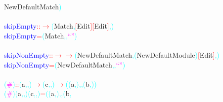 {\rm{}NewDefaultMatch}\textcolor{cyan}{)}\\\\\textcolor{blue}{skipEmpty}\hsspace \textcolor{red}{::}\hsspace \textcolor{red}{\ensuremath{\rightarrow}}\hsspace \textcolor{cyan}{(}{\rm{}Match}\textcolor{cyan}{,}\hsspace \textcolor{red}{[}{\rm{}Edit}\textcolor{red}{]}\hsspace \textcolor{red}{[}{\rm{}Edit}\textcolor{red}{]}\textcolor{cyan}{,}\textcolor{cyan}{)}\\\textcolor{blue}{skipEmpty}\hsspace \textcolor{red}{=}\hsspace \textcolor{cyan}{(}{\rm{}Match}\textcolor{cyan}{,}\textcolor{cyan}{,}\hsspace \textcolor{magenta}{``''}\textcolor{cyan}{)}\\\\\textcolor{blue}{skipNonEmpty}\hsspace \textcolor{red}{::}\hsspace \textcolor{red}{\ensuremath{\rightarrow}}\hsspace \textcolor{red}{\ensuremath{\rightarrow}}\hsspace \textcolor{cyan}{(}{\rm{}NewDefaultMatch}\textcolor{cyan}{,}\hsspace \textcolor{cyan}{(}{\rm{}NewDefaultModule}\textcolor{cyan}{)}\hsspace \textcolor{red}{[}{\rm{}Edit}\textcolor{red}{]}\textcolor{cyan}{,}\textcolor{cyan}{)}\\\textcolor{blue}{skipNonEmpty}\hsspace \textcolor{red}{=}\hsspace \textcolor{cyan}{(}{\rm{}NewDefaultMatch}\textcolor{cyan}{,}\textcolor{cyan}{,}\hsspace \textcolor{magenta}{``''}\textcolor{cyan}{)}\\\\\textcolor{cyan}{(}\textcolor{magenta}{\#}\textcolor{cyan}{)}\hsspace \textcolor{red}{::}\hsspace \textcolor{cyan}{(}{\rm{}a}\textcolor{cyan}{,}\textcolor{cyan}{,}\textcolor{cyan}{)}\hsspace \textcolor{red}{\ensuremath{\rightarrow}}\hsspace \textcolor{cyan}{(}{\rm{}c}\textcolor{cyan}{,}\textcolor{cyan}{,}\textcolor{cyan}{)}\hsspace \textcolor{red}{\ensuremath{\rightarrow}}\hsspace \textcolor{cyan}{(}\textcolor{cyan}{(}{\rm{}a}\textcolor{cyan}{,}\textcolor{cyan}{)}\textcolor{cyan}{,}\textcolor{cyan}{,}\hsspace \textcolor{cyan}{(}{\rm{}b}\textcolor{cyan}{,}\textcolor{cyan}{)}\textcolor{cyan}{)}\\\textcolor{cyan}{(}\textcolor{magenta}{\#}\textcolor{cyan}{)}\hsspace \textcolor{cyan}{(}{\rm{}a}\textcolor{cyan}{,}\textcolor{cyan}{,}\textcolor{cyan}{)}\hsspace \textcolor{cyan}{(}{\rm{}c}\textcolor{cyan}{,}\textcolor{cyan}{,}\textcolor{cyan}{)}\hsspace \textcolor{red}{=}\hsspace \textcolor{cyan}{(}\textcolor{cyan}{(}{\rm{}a}\textcolor{cyan}{,}\textcolor{cyan}{)}\textcolor{cyan}{,}\textcolor{cyan}{,}\hsspace \textcolor{cyan}{(}{\rm{}b}\textcolor{cyan}{,}\hsspace 